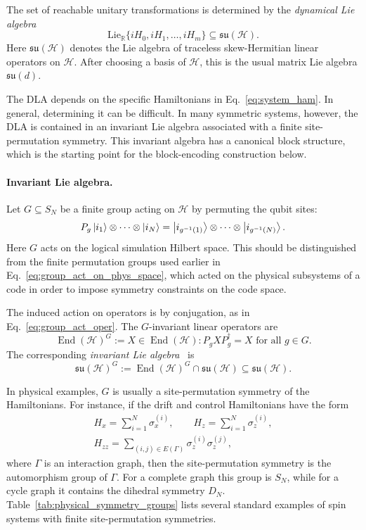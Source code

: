 \documentclass[10pt,twocolumn,superscriptaddress,aps,amsmath,amssymb,citeautoscript,floatfix,prx]{revtex4-2}
\newcounter{alg}
\theoremstyle{plain}
\theoremstyle{plain}
\theoremstyle{plain}
\theoremstyle{plain}
\theoremstyle{plain}
\theoremstyle{plain}
\theoremstyle{plain}
\theoremstyle{definition}
\theoremstyle{plain}
\begin{document}
The set of reachable unitary transformations is determined by the \textit{dynamical Lie algebra}~\cite{DAlessandro2021, Albertini2003}
$$
\mathrm{Lie}_{\mathbb R}
\{iH_0,iH_1,\ldots,iH_m\}
\subseteq
\mathfrak{su}(\mathcal H).
$$
Here $\mathfrak{su}(\mathcal H)$ denotes the Lie algebra of traceless skew-Hermitian linear operators on $\mathcal H$. After choosing a basis of $\mathcal H$, 
this is the usual matrix Lie algebra $\mathfrak{su}(d)$.

The DLA depends on the specific Hamiltonians in Eq.~\eqref{eq:system_ham}. In general, determining it can be difficult. 
In many symmetric systems, however, the DLA is contained in an invariant Lie algebra associated with a finite site-permutation symmetry. 
This invariant algebra has a canonical block structure, which is the starting point for the block-encoding construction below.

\paragraph{Invariant Lie algebra.}

Let $G\subseteq S_N$ be a finite group acting on $\mathcal H$ by permuting the qubit sites:
$$
P_g
\ket{i_1}\otimes\cdots\otimes\ket{i_N}
=
\ket{i_{g^{-1}(1)}}\otimes\cdots\otimes\ket{i_{g^{-1}(N)}} .
$$
Here $G$ acts on the logical simulation Hilbert space. This should be distinguished from the finite permutation groups used earlier in Eq.~\eqref{eq:group_act_on_phys_space}, 
which acted on the physical subsystems of a code in order to impose symmetry constraints on the code space.

The induced action on operators is by conjugation, as in Eq.~\eqref{eq:group_act_oper}. The $G$-invariant linear operators are
$$
\operatorname{End}(\mathcal H)^G
:=
{
X\in\operatorname{End}(\mathcal H):
P_gXP_g^\dagger=X
\text{ for all } g\in G
}.
$$
The corresponding \textit{invariant Lie algebra}~\cite{DAlessandroHartwig2021, Albertini2020} is
$$
\mathfrak{su}(\mathcal H)^G
:=
\operatorname{End}(\mathcal H)^G
\cap
\mathfrak{su}(\mathcal H)
\subseteq
\mathfrak{su}(\mathcal H).
$$

In physical examples, $G$ is usually a site-permutation symmetry of the Hamiltonians. For instance, if the drift and control Hamiltonians have the form
$$
\begin{gathered}
H_x
=
\sum_{i=1}^N\sigma_x^{(i)},
\qquad
H_z
=
\sum_{i=1}^N\sigma_z^{(i)},
\\
H_{zz}
=
\sum_{(i,j)\in E(\Gamma)}
\sigma_z^{(i)}\sigma_z^{(j)},
\end{gathered}
$$
where $\Gamma$ is an interaction graph, then the site-permutation symmetry is the automorphism group of $\Gamma$. 
For a complete graph this group is $S_N$, while for a cycle graph it contains the dihedral symmetry $D_N$. 
Table~\ref{tab:physical_symmetry_groups} lists several standard examples of spin systems with finite site-permutation symmetries.
\end{document}
